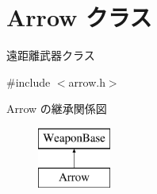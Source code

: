 \hypertarget{class_arrow}{}\section{Arrow クラス}
\label{class_arrow}


遠距離武器クラス  




{\ttfamily \#include $<$arrow.\+h$>$}

Arrow の継承関係図\begin{figure}[H]
\begin{center}
\leavevmode
\includegraphics[height=2.000000cm]{class_arrow}
\end{center}
\end{figure}
